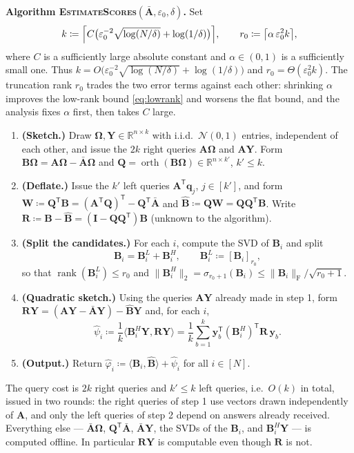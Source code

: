 \documentclass{article}
\renewcommand{\vec}[1]{\mathbf{#1}}          %
\newcommand{\T}{\mathsf{T}}                  %
\newcommand{\F}{\mathrm{F}}                  %
\newcommand{\eps}{\varepsilon}
\newcommand{\inner}[2]{\langle #1, #2 \rangle}
\DeclareMathOperator{\rank}{rank}
\DeclareMathOperator{\orth}{orth}
\theoremstyle{remark}
\begin{document}
\medskip
\noindent\textbf{Algorithm \textsc{EstimateScores}$(\bar{\vec{A}}, \eps_0, \delta)$.}
Set
\begin{equation}\label{eq:kdef}
k \coloneqq \Bigl\lceil C\bigl( \eps_0^{-2}\sqrt{\log(N/\delta)} + \log(1/\delta) \bigr) \Bigr\rceil,
\qquad
r_0 \coloneqq \bigl\lceil \alpha\, \eps_0^{2} k \bigr\rceil,
\end{equation}
where $C$ is a sufficiently large absolute constant and $\alpha \in (0,1)$ is a sufficiently small one.
Thus $k = O\bigl( \eps_0^{-2}\sqrt{\log(N/\delta)} + \log(1/\delta) \bigr)$ and $r_0 = \Theta(\eps_0^2 k)$.
The truncation rank $r_0$ trades the two error terms against each other: shrinking $\alpha$ improves the low-rank bound \cref{eq:lowrank} and worsens the flat bound, and the analysis fixes $\alpha$ first, then takes $C$ large.
\begin{enumerate}
\item \textbf{(Sketch.)}
Draw $\vec{\Omega}, \vec{Y} \in \mathbb{R}^{n \times k}$ with i.i.d.\ $\mathcal{N}(0,1)$ entries, independent of each other, and issue the $2k$ right queries $\vec{A}\vec{\Omega}$ and $\vec{A}\vec{Y}$.
Form $\vec{B}\vec{\Omega} = \vec{A}\vec{\Omega} - \bar{\vec{A}}\vec{\Omega}$ and $\vec{Q} = \orth(\vec{B}\vec{\Omega}) \in \mathbb{R}^{n \times k'}$, $k' \le k$.
\item \textbf{(Deflate.)}
Issue the $k'$ left queries $\vec{A}^\T\vec{q}_j$, $j \in [k']$, and form $\vec{W} \coloneqq \vec{Q}^\T\vec{B} = (\vec{A}^\T\vec{Q})^\T - \vec{Q}^\T\bar{\vec{A}}$ and $\widehat{\vec{B}} \coloneqq \vec{Q}\vec{W} = \vec Q\vec Q^\T\vec B$.
Write $\vec{R} \coloneqq \vec{B} - \widehat{\vec{B}} = (\vec{I} - \vec{Q}\vec{Q}^\T)\vec{B}$ (unknown to the algorithm).
\item \textbf{(Split the candidates.)}
For each $i$, compute the SVD of $\vec{B}_i$ and split
\[
\vec{B}_i = \vec{B}_i^L + \vec{B}_i^H,
\qquad
\vec{B}_i^L \coloneqq [\vec{B}_i]_{r_0},
\]
so that $\rank(\vec{B}_i^L) \le r_0$ and $\|\vec{B}_i^H\|_2 = \sigma_{r_0+1}(\vec B_i) \le \|\vec{B}_i\|_\F / \sqrt{r_0 + 1}$.
\item \textbf{(Quadratic sketch.)}
Using the queries $\vec{A}\vec{Y}$ already made in step 1, form $\vec{R}\vec{Y} =(\vec{A}\vec{Y} - \bar{\vec{A}}\vec{Y}) - \widehat{\vec{B}}\vec{Y}$ and, for each $i$,
\[
\hat{\psi}_i \coloneqq \frac{1}{k} \inner{\vec{B}_i^H \vec{Y}}{\vec{R}\vec{Y}} = \frac{1}{k}\sum_{b=1}^{k} \vec{y}_b^\T (\vec{B}_i^H)^\T \vec{R}\, \vec{y}_b .
\]
\item \textbf{(Output.)}
Return $\hat{\varphi}_i \coloneqq \inner{\vec{B}_i}{\widehat{\vec{B}}} + \hat{\psi}_i$ for all $i \in [N]$.
\end{enumerate}
The query cost is $2k$ right queries and $k' \le k$ left queries, i.e.\ $O(k)$ in total, issued in two rounds: the right queries of step 1 use vectors drawn independently of $\vec{A}$, and only the left queries of step 2 depend on answers already received.
Everything else --- $\bar{\vec{A}}\vec{\Omega}$, $\vec{Q}^\T\bar{\vec{A}}$, $\bar{\vec{A}}\vec{Y}$, the SVDs of the $\vec{B}_i$, and $\vec{B}_i^H\vec{Y}$ --- is computed offline.
In particular $\vec R\vec Y$ is computable even though $\vec R$ is not.
\end{document}
